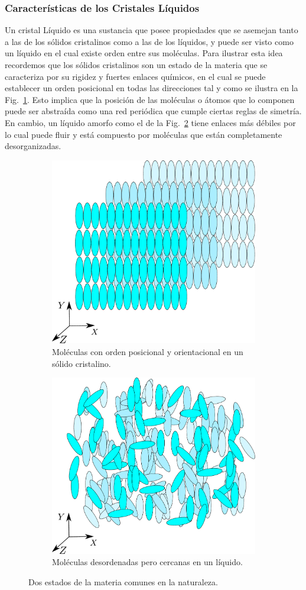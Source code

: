 \subsubsection{Características de los Cristales Líquidos}  
Un cristal Líquido es una sustancia que posee propiedades que
se asemejan tanto a las de los sólidos cristalinos como a las de los
líquidos, y puede ser visto como un líquido en el cual existe
orden entre sus moléculas. Para ilustrar esta idea recordemos que los
sólidos cristalinos son un estado de la materia que se caracteriza por
su rigidez y fuertes enlaces químicos, en el cual se puede
establecer un orden posicional en todas las direcciones tal y como se
ilustra en la Fig.~\ref{fig:solido}. Esto implica que la posición de
las moléculas o átomos que lo componen puede ser abstraída como una
red periódica que cumple ciertas reglas de simetría. En cambio, un
líquido amorfo como el de la Fig.~\ref{fig:liquido} tiene enlaces
más débiles por lo cual puede fluir y está compuesto
por moléculas que están completamente desorganizadas. 
\begin{figure}[h!]
\centering
\begin{subfigure}{.45\textwidth}
  \centering
  \includegraphics[width=.6\linewidth]{Cristaline_solid}
  \caption{Moléculas con orden posicional y orientacional en un sólido cristalino.}
  \label{fig:solido}
\end{subfigure}\qquad
\begin{subfigure}{.45\textwidth}
  \centering
  \includegraphics[width=.6\linewidth]{liquid}
  \caption{Moléculas desordenadas pero cercanas en un líquido.}
  \label{fig:liquido}
\end{subfigure}
\caption{Dos estados de la materia comunes en la naturaleza.}
  \label{fig:estados}
\end{figure}

